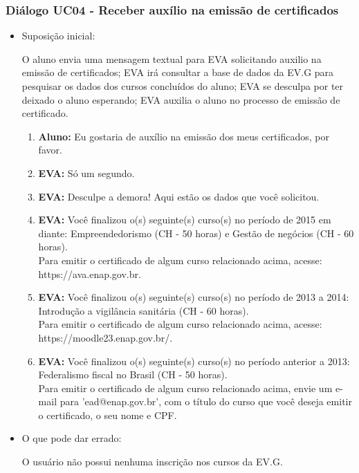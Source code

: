 \subsubsection{Diálogo UC04 - Receber auxílio na emissão de certificados}

\begin{itemize}
    \item Suposição inicial:
    
        O aluno envia uma mensagem textual para EVA solicitando auxilio na emissão de certificados; EVA irá consultar a base de dados da EV.G para pesquisar os dados dos cursos concluídos do aluno; EVA se desculpa por ter deixado o aluno esperando; EVA auxilia o aluno no processo de emissão de certificado.
        
        \begin{enumerate}
            \item \textbf{Aluno:} Eu gostaria de auxílio na emissão dos meus certificados, por favor.
            \item \textbf{EVA:} Só um segundo.
            \item \textbf{EVA:} Desculpe a demora! Aqui estão os dados que você solicitou.
            \item \textbf{EVA:} Você finalizou o(s) seguinte(s) curso(s) no período de 2015 em diante: Empreendedorismo (CH - 50 horas) e Gestão de negócios (CH - 60 horas). \\
            Para emitir o certificado de algum curso relacionado acima, acesse: https://ava.enap.gov.br.
            \item \textbf{EVA:} Você finalizou o(s) seguinte(s) curso(s) no período de 2013 a 2014: Introdução a vigilância sanitária (CH - 60 horas). \\
            Para emitir o certificado de algum curso relacionado acima, acesse: https://moodle23.enap.gov.br/.
            \item \textbf{EVA:} Você finalizou o(s) seguinte(s) curso(s) no período anterior a 2013: Federalismo fiscal no Brasil (CH - 50 horas). \\
            Para emitir o certificado de algum curso relacionado acima, envie um e-mail para 'ead@enap.gov.br', com o título do curso que você deseja emitir o certificado, o seu nome e CPF.
        \end{enumerate}
    
    \item O que pode dar errado:
    
        O usuário não possui nenhuma inscrição nos cursos da EV.G.
        

\end{itemize}
